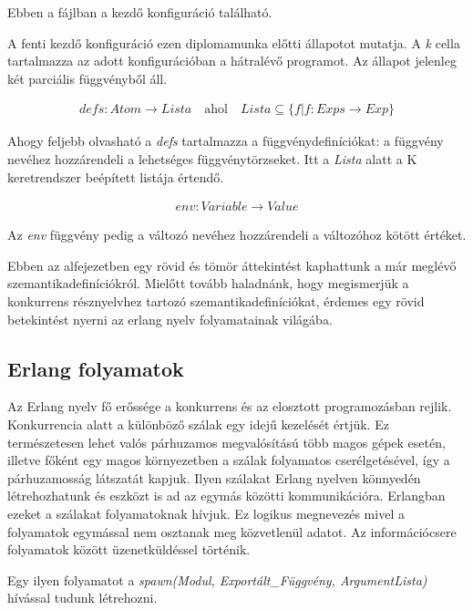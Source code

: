 Ebben a fájlban a kezdő konfiguráció található.



A fenti kezdő konfiguráció ezen diplomamunka előtti állapotot mutatja. A \textit{k} cella tartalmazza az adott konfigurációban a hátralévő programot. Az állapot jelenleg két parciális függvényből áll. 

\begin{align*}
defs: Atom \rightarrow Lista \quad \textrm{ahol} \quad Lista \subseteq \{f | f : Exps \rightarrow Exp\}
\end{align*}

Ahogy feljebb olvasható a \textit{defs} tartalmazza a függvénydefiníciókat: a függvény nevéhez hozzárendeli a lehetséges függvénytörzseket. Itt a \textit{Lista} alatt a K keretrendszer beépített listája értendő.

\begin{align*}
env: Variable \rightarrow Value
\end{align*}

Az \textit{env} függvény pedig a változó nevéhez hozzárendeli a változóhoz kötött értéket.

Ebben az alfejezetben egy rövid és tömör áttekintést kaphattunk a már meglévő szemantikadefiníciókról. Mielőtt tovább haladnánk, hogy megismerjük a konkurrens résznyelvhez tartozó szemantikadefiníciókat, érdemes egy rövid betekintést nyerni az erlang nyelv folyamatainak világába.

\subsection{Erlang folyamatok}
Az Erlang nyelv fő erőssége a konkurrens és az elosztott programozásban rejlik. Konkurrencia alatt a különböző szálak egy idejű kezelését értjük. Ez természetesen lehet valós párhuzamos megvalósítású több magos gépek esetén, illetve főként egy magos környezetben a szálak folyamatos cserélgetésével, így a párhuzamosság látszatát kapjuk. Ilyen szálakat Erlang nyelven könnyedén létrehozhatunk és eszközt is ad az egymás közötti kommunikációra. Erlangban ezeket a szálakat folyamatoknak hívjuk. Ez logikus megnevezés mivel a folyamatok egymással nem osztanak meg közvetlenül adatot. Az információcsere folyamatok között üzenetküldéssel történik.

Egy ilyen folyamatot a \textit{spawn(Modul, Exportált\_Függvény, ArgumentLista)} hívással tudunk létrehozni.



